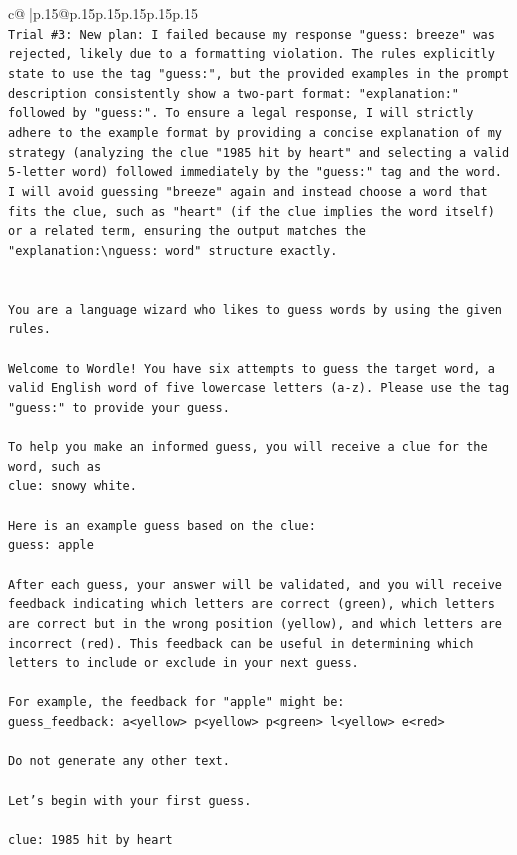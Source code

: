 \documentclass{article}
\begin{document}
{\begin{supertabular}{c@{$\;$}|p{.15\linewidth}@{}p{.15\linewidth}p{.15\linewidth}p{.15\linewidth}p{.15\linewidth}p{.15\linewidth}}
{{{\\ 
\texttt{Trial \#3: New plan: I failed because my response "guess: breeze" was rejected, likely due to a formatting violation. The rules explicitly state to use the tag "guess:", but the provided examples in the prompt description consistently show a two{-}part format: "explanation:" followed by "guess:". To ensure a legal response, I will strictly adhere to the example format by providing a concise explanation of my strategy (analyzing the clue "1985 hit by heart" and selecting a valid 5{-}letter word) followed immediately by the "guess:" tag and the word. I will avoid guessing "breeze" again and instead choose a word that fits the clue, such as "heart" (if the clue implies the word itself) or a related term, ensuring the output matches the "explanation:\textbackslash{}nguess: word" structure exactly.} \\
\\ 
\\ 
\texttt{You are a language wizard who likes to guess words by using the given rules.} \\
\\ 
\texttt{Welcome to Wordle! You have six attempts to guess the target word, a valid English word of five lowercase letters (a{-}z). Please use the tag "guess:" to provide your guess.} \\
\\ 
\texttt{To help you make an informed guess, you will receive a clue for the word, such as} \\
\texttt{clue: snowy white.} \\
\\ 
\texttt{Here is an example guess based on the clue: } \\
\texttt{guess: apple} \\
\\ 
\texttt{After each guess, your answer will be validated, and you will receive feedback indicating which letters are correct (green), which letters are correct but in the wrong position (yellow), and which letters are incorrect (red). This feedback can be useful in determining which letters to include or exclude in your next guess.} \\
\\ 
\texttt{For example, the feedback for "apple" might be:} \\
\texttt{guess\_feedback: a<yellow> p<yellow> p<green> l<yellow> e<red>} \\
\\ 
\texttt{Do not generate any other text.} \\
\\ 
\texttt{Let's begin with your first guess.} \\
\\ 
\texttt{clue: 1985 hit by heart} \\
            }
        }
    }
     \\ \\


\end{supertabular}}
\end{document}
